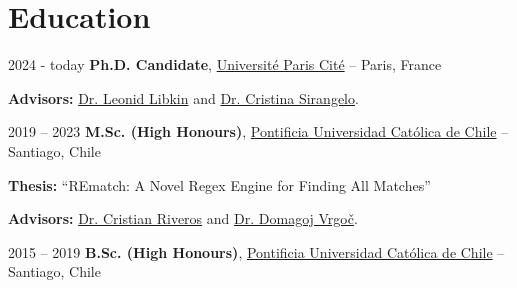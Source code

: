 \section{Education}

\begin{twocolentry}{
    2024 - today
}
\textbf{Ph.D. Candidate}, \href{https://u-paris.fr/}{Université Paris Cité} -- Paris, France    
\end{twocolentry}
\vspace{0.1 cm}

\begin{onecolentry}
    \begin{highlights}
        \item \textbf{Advisors:} \href{http://libk.in/}{Dr. Leonid Libkin} and \href{https://www.irif.fr/~cristina/}{Dr. Cristina Sirangelo}.
    \end{highlights}
\end{onecolentry}
\vspace{0.2 cm}

\begin{twocolentry}{
    2019 – 2023
}
    \textbf{M.Sc. (High Honours)}, \href{https://www.uc.cl/}{Pontificia Universidad Católica de Chile} -- Santiago, Chile\end{twocolentry}

\vspace{0.10 cm}
\begin{onecolentry}
    \begin{highlights}
        \item \textbf{Thesis:} ``REmatch: A Novel Regex Engine for Finding All Matches''
        \item \textbf{Advisors:} \href{https://criveros.sitios.ing.uc.cl/}{Dr. Cristian Riveros} and \href{https://dvrgoc.ing.puc.cl/}{Dr. Domagoj Vrgoč}.
    \end{highlights}
\end{onecolentry}

\vspace{0.2 cm}

\begin{twocolentry}{
    2015 – 2019
}
    \textbf{B.Sc. (High Honours)}, \href{https://www.uc.cl/}{Pontificia Universidad Católica de Chile} -- Santiago, Chile\end{twocolentry} 